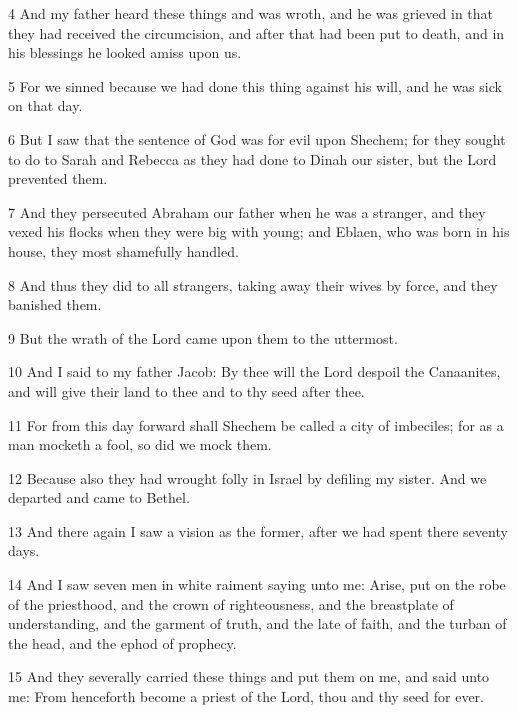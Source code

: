 \par 4 And my father heard these things and was wroth, and he was grieved in that they had received the circumcision, and after that had been put to death, and in his blessings he looked amiss upon us.

\par 5 For we sinned because we had done this thing against his will, and he was sick on that day.

\par 6 But I saw that the sentence of God was for evil upon Shechem; for they sought to do to Sarah and Rebecca as they had done to Dinah our sister, but the Lord prevented them.

\par 7 And they persecuted Abraham our father when he was a stranger, and they vexed his flocks when they were big with young; and Eblaen, who was born in his house, they most shamefully handled.

\par 8 And thus they did to all strangers, taking away their wives by force, and they banished them.

\par 9 But the wrath of the Lord came upon them to the uttermost.

\par 10 And I said to my father Jacob: By thee will the Lord despoil the Canaanites, and will give their land to thee and to thy seed after thee.

\par 11 For from this day forward shall Shechem be called a city of imbeciles; for as a man mocketh a fool, so did we mock them.

\par 12 Because also they had wrought folly in Israel by defiling my sister. And we departed and came to Bethel.

\par 13 And there again I saw a vision as the former, after we had spent there seventy days.

\par 14 And I saw seven men in white raiment saying unto me: Arise, put on the robe of the priesthood, and the crown of righteousness, and the breastplate of understanding, and the garment of truth, and the late of faith, and the turban of the head, and the ephod of prophecy.

\par 15 And they severally carried these things and put them on me, and said unto me: From henceforth become a priest of the Lord, thou and thy seed for ever.

